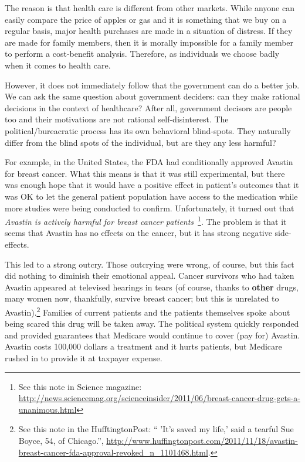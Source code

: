 The reason is that health care is different from other markets. While anyone
can easily compare the price of apples or gas and it is something that we buy
on a regular basis, major health purchases are made in a situation of distress.
If they are made for family members, then it is morally impossible for a family
member to perform a cost-benefit analysis. Therefore, as individuals we choose
badly when it comes to health care.

However, it does not immediately follow that the government can do a better
job. We can ask the same question about government deciders: can they make
rational decisions in the context of healthcare? After all, government decisors
are people too and their motivations are not rational self-disinterest. The
political/bureacratic process has its own behavioral blind-spots. They
naturally differ from the blind spots of the individual, but are they any less
harmful?

For example, in the United States, the FDA had conditionally approved Avastin
for breast cancer. What this means is that it was still experimental, but there
was enough hope that it would have a positive effect in patient's outcomes that
it was OK to let the general patient population have access to the medication
while more studies were being conducted to confirm. Unfortunately, it turned
out that \emph{Avastin is actively harmful for breast cancer
patients}~\cite{avastin-harfmul}\footnote{See this note in Science magazine:
\url{http://news.sciencemag.org/scienceinsider/2011/06/breast-cancer-drug-gets-a-unanimous.html}}.
The problem is that it seems that Avastin has no effects on the cancer, but it
has strong negative side-effects.

This led to a strong outcry. Those outcrying were wrong, of course, but this
fact did nothing to diminish their emotional appeal. Cancer survivors who had
taken Avastin appeared at televised hearings in tears (of course, thanks to
\textbf{other} drugs, many women now, thankfully, survive breast cancer; but
this is unrelated to Avastin).\footnote{See this note in the HufftingtonPost:
`` 'It's saved my life,' said a tearful Sue Boyce, 54, of Chicago.'',
\url{http://www.huffingtonpost.com/2011/11/18/avastin-breast-cancer-fda-approval-revoked_n_1101468.html}.}
Families of current patients and the patients themselves spoke about being
scared this drug will be taken away. The political system quickly responded and
provided guarantees that Medicare would continue to cover (pay for) Avastin.
Avastin costs 100,000 dollars a treatment and it hurts patients, but Medicare
rushed in to provide it at taxpayer expense.

